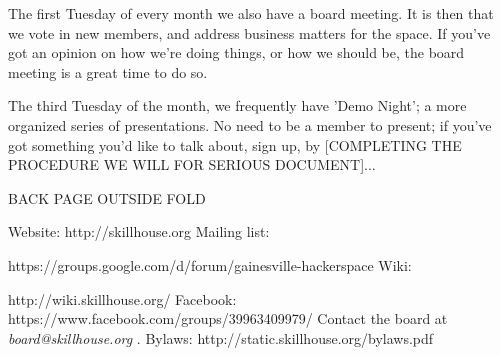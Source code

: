 \documentclass{leaflet}
\begin{document}
The first Tuesday of every month we also have a board meeting.  It is
then that we vote in new members, and address business matters for the
space.  If you've got an opinion on how we're doing things, or how we
should be, the board meeting is a great time to do so.

The third Tuesday of the month, we frequently have 'Demo Night'; a
more organized series of presentations.  No need to be a member to
present; if you've got something you'd like to talk about, sign up, by
[COMPLETING THE PROCEDURE WE WILL FOR SERIOUS DOCUMENT]...




\newpage

BACK PAGE OUTSIDE FOLD

Website: http://skillhouse.org 
Mailing list: 

https://groups.google.com/d/forum/gainesville-hackerspace
Wiki: 

http://wiki.skillhouse.org/ 
Facebook:  https://www.facebook.com/groups/39963409979/
Contact the board at \textit{ board@skillhouse.org }. 
Bylaws: http://static.skillhouse.org/bylaws.pdf
\end{document}
